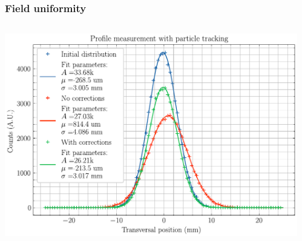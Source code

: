 \begin{frame}
  \frametitle{Field uniformity}
  \begin{columns}
    \begin{column}{0.8\textwidth}
      \includegraphics[width=1\textwidth]{03_SIM/fig/fig025_AsymTransversalProfile}

    \end{column}
    \begin{column}{0.2\textwidth}

    \end{column}
  \end{columns}
\end{frame}






